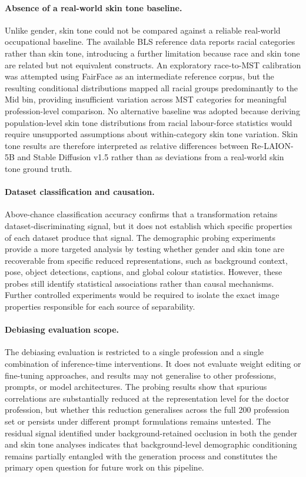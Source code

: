 \paragraph{Absence of a real-world skin tone baseline.}
Unlike gender, skin tone could not be compared against a reliable real-world occupational baseline. The available BLS reference data reports racial categories rather than skin tone, introducing a further limitation because race and skin tone are related but not equivalent constructs. An exploratory race-to-MST calibration was attempted using FairFace as an intermediate reference corpus, but the resulting conditional distributions mapped all racial groups predominantly to the Mid bin, providing insufficient variation across MST categories for meaningful profession-level comparison. No alternative baseline was adopted because deriving population-level skin tone distributions from racial labour-force statistics would require unsupported assumptions about within-category skin tone variation. Skin tone results are therefore interpreted as relative differences between Re-LAION-5B and Stable Diffusion v1.5 rather than as deviations from a real-world skin tone ground truth.

\paragraph{Dataset classification and causation.}
Above-chance classification accuracy confirms that a transformation retains dataset-discriminating signal, but it does not establish which specific properties of each dataset produce that signal. The demographic probing experiments provide a more targeted analysis by testing whether gender and skin tone are recoverable from specific reduced representations, such as background context, pose, object detections, captions, and global colour statistics. However, these probes still identify statistical associations rather than causal mechanisms. Further controlled experiments would be required to isolate the exact image properties responsible for each source of separability.

\paragraph{Debiasing evaluation scope.}
The debiasing evaluation is restricted to a single profession and a single combination of inference-time interventions. It does not evaluate weight editing or fine-tuning approaches, and results may not generalise to other professions, prompts, or model architectures. The probing results show that spurious correlations are substantially reduced at the representation level for the doctor profession, but whether this reduction generalises across the full 200 profession set or persists under different prompt formulations remains untested. The residual signal identified under background-retained occlusion in both the gender and skin tone analyses indicates that background-level demographic conditioning remains partially entangled with the generation process and constitutes the primary open question for future work on this pipeline.

